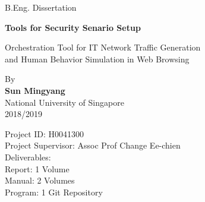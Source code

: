 \documentclass[12pt]{report}
\begin{document}
\begin{titlepage}
	\begin{center}

		B.Eng. Dissertation
		\vspace*{0.5cm}

		{\LARGE \textbf{Tools for Security Senario Setup}}

		Orchestration Tool for IT Network Traffic Generation\\
		and Human Behavior Simulation in Web Browsing

		\vspace{2cm}

		\begin{large}
			By\\
			\textbf{Sun Mingyang}\\
			National University of Singapore\\
			2018/2019\\
		\end{large}

		\vfill
	\end{center}

	\begin{flushleft}
		\begin{large}
			Project ID: H0041300\\
			Project Supervisor: Assoc Prof Change Ee-chien\\
			\vspace{0.5cm}
			Deliverables:\\
			\setlength{\parindent}{30pt}
			Report: 1 Volume\\
			Manual: 2 Volumes\\
			Program: 1 Git Repository\\
		\end{large}
	\end{flushleft}

\end{titlepage}
\end{document}
